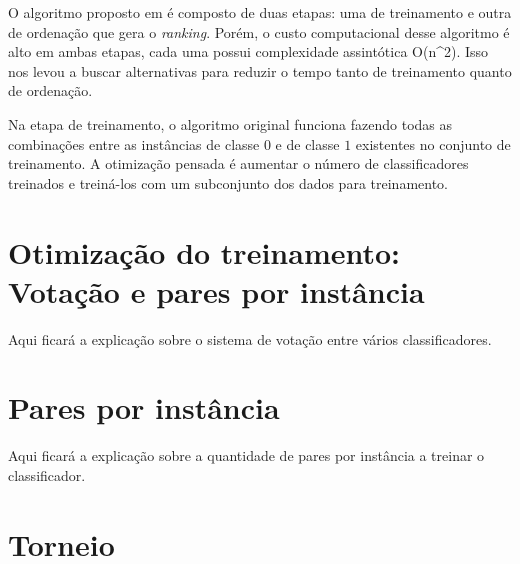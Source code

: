 O algoritmo proposto em \cite{langford08} é composto de duas etapas: uma de treinamento e outra de ordenação que gera o \emph{ranking}. Porém, o custo computacional desse algoritmo é alto em ambas etapas, cada uma possui complexidade assintótica O(n^2). Isso nos levou a buscar alternativas para reduzir o tempo tanto de treinamento quanto de ordenação.

Na etapa de treinamento, o algoritmo original funciona fazendo todas as combinações entre as instâncias de classe $0$ e de classe $1$ existentes no conjunto de treinamento. A otimização pensada é aumentar o número de classificadores treinados e treiná-los com um subconjunto dos dados para treinamento.

\section{Otimização do treinamento: Votação e pares por instância}
Aqui ficará a explicação sobre o sistema de votação entre vários classificadores.

\section{Pares por instância}
Aqui ficará a explicação sobre a quantidade de pares por instância a treinar o classificador.

\section{Torneio}
